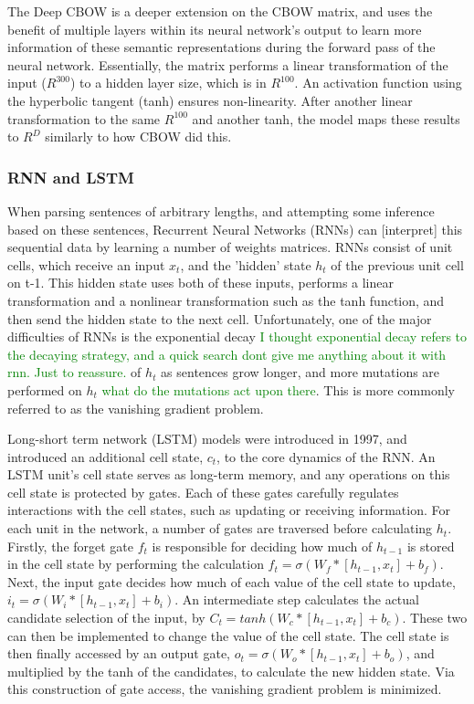 The Deep CBOW is a deeper extension on the CBOW matrix, and uses the benefit of
multiple layers within its neural network's output to learn more information of
these semantic representations during the forward pass of the neural network.
Essentially, the matrix performs a linear transformation of the input ($R^{300}$)
to a hidden layer size, which is in $R^{100}$. An activation function using the
hyperbolic tangent (tanh) ensures non-linearity. After another linear
transformation to the same $R^{100}$ and another tanh, the model maps these
results to $R^D$ similarly to how CBOW did this. 


\subsubsection{RNN and LSTM}
When parsing sentences of arbitrary lengths, and attempting some inference based
on these sentences, Recurrent Neural Networks (RNNs) can [interpret] this
sequential data by learning a number of weights matrices. RNNs consist of unit
cells, which receive an input $x_t$, and the 'hidden' state $h_t$ of the
previous unit cell on t-1. This hidden state uses both of these inputs, performs
a linear transformation and a nonlinear transformation such as the tanh
function, and then send the hidden state to the next cell. Unfortunately, one of
the major difficulties of RNNs is the exponential decay \textcolor{green}{I
thought exponential decay refers to the decaying strategy, and a quick search
dont give me anything about it with rnn. Just to reassure.} of $h_t$ as
sentences grow {longer}, and more mutations are performed on $h_t$
\cite{bengio1994learning}\textcolor{green}{what do the mutations act upon
there}. This is more commonly referred to as the vanishing gradient problem.

Long-short term network (LSTM) models \cite{hochreiter1997long} were introduced
in 1997, and introduced an additional cell state, $c_t$, to the core dynamics of
the RNN. An LSTM unit's cell state serves as long-term memory, and any
operations on this cell state is protected by gates. Each of these gates
carefully regulates interactions with the cell states, such as updating or
receiving information. For each unit in the network, a number of gates are
traversed before calculating $h_t$. Firstly, the forget gate $f_t$ is
responsible for deciding how much of $h_{t-1}$ is stored in the cell state by
performing the calculation $f_t = \sigma(W_f * [h_{t-1}, x_t] + b_f)$. Next, the
input gate decides how much of each value of the cell state to update, $i_t =
\sigma(W_i * [h_{t-1}, x_t] + b_i)$. An intermediate step calculates the actual
candidate selection of the input, by $C_t = tanh(W_c * [h_{t-1}, x_t] + b_c)$.
These two can then be implemented to change the value of the cell state. The
cell state is then finally accessed by an output gate, $o_t = \sigma(W_o *
[h_{t-1}, x_t] + b_o)$, and multiplied by the tanh of the candidates, to
calculate the new hidden state. Via this construction of gate access, the
vanishing gradient problem is minimized.
